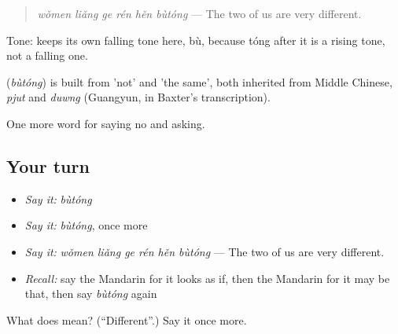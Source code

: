 \begin{quote}
\textbf{} \emph{wǒmen liǎng ge rén hěn bùtóng} — The two of us are very different.
\end{quote}

Tone:  keeps its own falling tone here, bù, because tóng after it is a rising tone, not a falling one.

\begin{cousinweb}
\textbf{} (\emph{bùtóng}) is built from  'not' and  'the same', both inherited from Middle Chinese, \emph{pjut} and \emph{duwng} (Guangyun, in Baxter's transcription).
\end{cousinweb}

\begin{grammarlens}[title={What you've built}]
One more word for saying no and asking.
\end{grammarlens}

\subsection*{Your turn}
\begin{itemize}
\raggedright
  \item \emph{Say it:} \emph{bùtóng}
  \item \emph{Say it:} \emph{bùtóng}, once more
  \item \emph{Say it:} \emph{wǒmen liǎng ge rén hěn bùtóng} — The two of us are very different.
  \item \emph{Recall:} say the Mandarin for it looks as if, then the Mandarin for it may be that, then say \emph{bùtóng} again
\end{itemize}

\begin{tcolorbox}[breakable,colback=teal!4,colframe=teal!35!black,title={Before you move on}]
What does  mean? (\textquotedblleft{}Different\textquotedblright{}.) Say it once more.
\end{tcolorbox}

